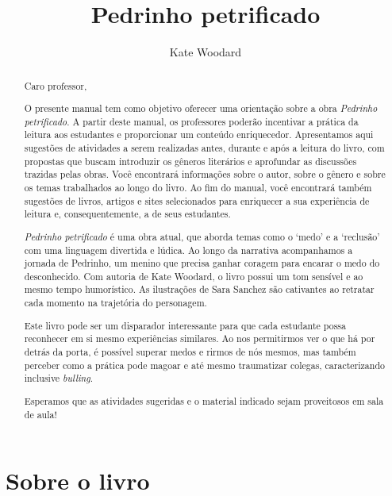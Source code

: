 \documentclass[11pt]{extarticle}
\newcommand{\AutorLivro}{Kate Woodard}
\newcommand{\TituloLivro}{Pedrinho petrificado}
\newcommand{\colaborador}{Ana Lancman}
\begin{document}
\title{\TituloLivro}
\author{\AutorLivro}
\def\authornotes{\colaborador}

\date{}
\maketitle


\tableofcontents

\begin{abstract}
Caro professor,\medskip

O presente manual tem como objetivo oferecer uma orientação sobre a obra \textit{Pedrinho petrificado}. A partir deste manual, os professores poderão incentivar a prática da leitura aos estudantes e proporcionar um conteúdo enriquecedor. Apresentamos aqui sugestões de atividades a serem realizadas antes, durante e após a leitura do livro, com propostas que buscam introduzir os gêneros literários e aprofundar as discussões trazidas pelas obras. Você encontrará informações sobre o autor, sobre o gênero e sobre os temas trabalhados ao longo do livro. Ao fim do manual, você encontrará também sugestões de livros, artigos e sites selecionados para enriquecer a sua experiência de leitura e, consequentemente, a de seus estudantes.

\textit{Pedrinho petrificado} é uma obra atual, que aborda temas como o `medo' e a `reclusão' com uma linguagem divertida e lúdica. Ao longo da narrativa acompanhamos a jornada de Pedrinho, um menino que precisa ganhar coragem para encarar o medo do desconhecido. Com autoria de Kate Woodard, o livro possui um tom sensível e ao mesmo tempo humorístico. As ilustrações de Sara Sanchez são cativantes ao retratar cada momento na trajetória do personagem. 

Este livro pode ser um disparador interessante para que cada estudante possa reconhecer em si mesmo experiências similares. Ao nos permitirmos ver o que há por detrás da porta, é possível superar medos e rirmos de nós mesmos, mas também perceber como a prática pode magoar e até mesmo traumatizar colegas, caracterizando inclusive \textit{bulling}. 

Esperamos que as atividades sugeridas e o material indicado sejam proveitosos em sala de aula! 

\end{abstract}

\section{Sobre o livro}
\end{document}
